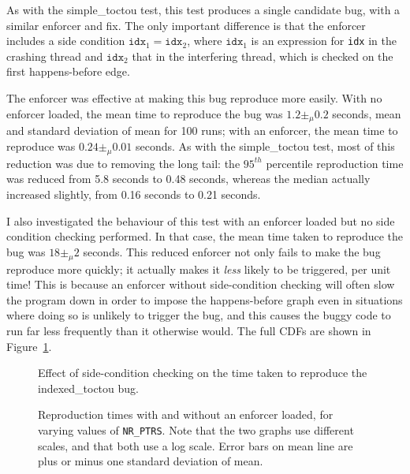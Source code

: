 As with the simple\_toctou test, this test produces a single candidate
bug, with a similar enforcer and fix.  The only important difference
is that the enforcer includes a side condition $\mathtt{idx}_1 =
\mathtt{idx}_2$, where $\mathtt{idx}_1$ is an expression for
\texttt{idx} in the crashing thread and $\mathtt{idx}_2$ that in the
interfering thread, which is checked on the first happens-before edge.

The enforcer was effective at making this bug reproduce more easily.
With no enforcer loaded, the mean time to reproduce the bug was $1.2
\pm_\mu 0.2$ seconds, mean and standard deviation of mean for 100
runs; with an enforcer, the mean time to reproduce was $0.24 \pm_\mu
0.01$ seconds.  As with the simple\_toctou test, most of this
reduction was due to removing the long tail: the $95^{th}$ percentile
reproduction time was reduced from 5.8 seconds to 0.48 seconds,
whereas the median actually increased slightly, from 0.16 seconds to
0.21 seconds.  

I also investigated the behaviour of this test with an enforcer loaded
but no side condition checking performed.  In that case, the mean time
taken to reproduce the bug was $18 \pm_\mu 2$ seconds.  This reduced
enforcer not only fails to make the bug reproduce more quickly; it
actually makes it \emph{less} likely to be triggered, per unit time!
This is because an enforcer without side-condition checking will often
slow the program down in order to impose the happens-before graph even
in situations where doing so is unlikely to trigger the bug, and this
causes the buggy code to run far less frequently than it otherwise
would.  The full CDFs are shown in
Figure~\ref{fig:eval:indexed_toctou:no_scs}.

\begin{figure}
  
  \caption{Effect of side-condition checking on the time taken to
    reproduce the indexed\_toctou bug.}
  \label{fig:eval:indexed_toctou:no_scs}
\end{figure}

\begin{figure}
  \caption{Reproduction times with and without an enforcer loaded, for
    varying values of \texttt{NR\_PTRS}.  Note that the two graphs use
    different scales, and that both use a log scale.  Error bars on
    mean line are plus or minus one standard deviation of mean.}
  \label{fig:eval:indexed_toctou:nr_ptrs}
\end{figure}

